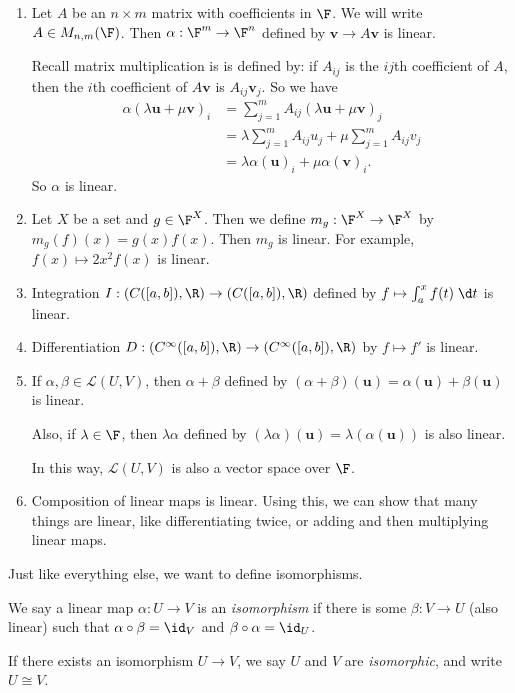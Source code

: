 \documentclass[a4paper]{article}
\begin{document}
\begin{eg}\leavevmode
  \begin{enumerate}
    \item Let $A$ be an $n\times m$ matrix with coefficients in $\F$. We will write $A\in M_{n, m}(\F)$. Then $\alpha: \F^m \to \F^n$ defined by $\mathbf{v}\to A\mathbf{v}$ is linear.

      Recall matrix multiplication is is defined by: if $A_{ij}$ is the $ij$th coefficient of $A$, then the $i$th coefficient of $A\mathbf{v}$ is $A_{ij}\mathbf{v}_j$. So we have
      \begin{align*}
        \alpha(\lambda \mathbf{u} + \mu \mathbf{v})_i &= \sum_{j = 1}^m A_{ij}(\lambda \mathbf{u} + \mu \mathbf{v})_j \\
        &= \lambda \sum_{j = 1}^m A_{ij}u_j + \mu \sum_{j = 1}^m A_{ij} v_j \\
        &= \lambda \alpha(\mathbf{u})_i + \mu \alpha(\mathbf{v})_i.
      \end{align*}
      So $\alpha$ is linear.
    \item Let $X$ be a set and $g\in \F^X$. Then we define $m_g: \F^X \to \F^X$ by $m_g(f)(x) = g(x) f(x)$. Then $m_g$ is linear. For example, $f(x) \mapsto 2x^2 f(x)$ is linear.
    \item Integration $I: (C([a, b]), \R) \to (C([a, b]), \R)$ defined by $f\mapsto \int_a^x f(t) \;\d t$ is linear.
    \item Differentiation $D: (C^\infty ([a, b]), \R) \to (C^\infty ([a, b]), \R)$ by $ f\mapsto f'$ is linear.
    \item If $\alpha, \beta\in \mathcal{L}(U, V)$, then $\alpha + \beta$ defined by $(\alpha + \beta)(\mathbf{u}) = \alpha(\mathbf{u}) + \beta(\mathbf{u})$ is linear.

      Also, if $\lambda \in \F$, then $\lambda \alpha$ defined by $(\lambda \alpha)(\mathbf{u}) = \lambda (\alpha (\mathbf{u}))$ is also linear.

      In this way, $\mathcal{L}(U, V)$ is also a vector space over $\F$.
    \item Composition of linear maps is linear. Using this, we can show that many things are linear, like differentiating twice, or adding and then multiplying linear maps.
  \end{enumerate}
\end{eg}

Just like everything else, we want to define isomorphisms.
\begin{defi}[Isomorphism]
  We say a linear map $\alpha: U\to V$ is an \emph{isomorphism} if there is some $\beta: V\to U$ (also linear) such that $\alpha \circ \beta = \id_V$ and $\beta\circ \alpha = \id_U$.

  If there exists an isomorphism $U\to V$, we say $U$ and $V$ are \emph{isomorphic}, and write $U\cong V$.
\end{defi}
\end{document}
